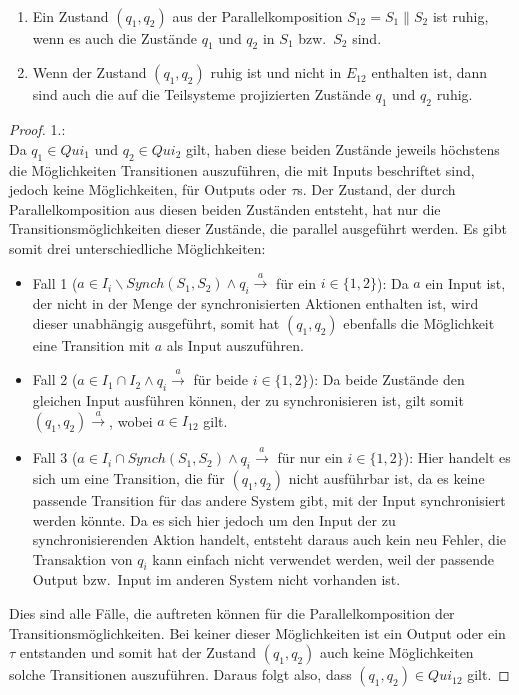 \begin{lem}
  \label{lemRuheParallelkomp}
  ~
  \begin{enumerate}
    \item Ein Zustand $(q_1,q_2)$ aus der Parallelkomposition $S_{12}=S_1\|S_2$
      ist ruhig, wenn es auch die Zustände $q_1$ und $q_2$ in $S_1$ bzw.\ $S_2$
      sind.
    \item Wenn der Zustand $(q_1,q_2)$ ruhig ist und nicht in $E_{12}$
      enthalten ist, dann sind auch die auf die Teilsysteme projizierten
      Zustände $q_1$ und $q_2$ ruhig.
  \end{enumerate}
\end{lem}

\begin{proof}
  1.:\\
  Da $q_1\in Qui_1$ und $q_2\in Qui_2$ gilt, haben
  diese beiden Zustände jeweils höchstens die Möglichkeiten Transitionen
  auszuführen, die mit Inputs beschriftet sind, jedoch keine Möglichkeiten, für
  Outputs oder $\tau$s. Der Zustand, der durch Parallelkomposition aus diesen
  beiden Zuständen entsteht, hat nur die Transitionsmöglichkeiten dieser
  Zustände, die parallel ausgeführt werden. Es gibt somit drei unterschiedliche
  Möglichkeiten:
  \begin{itemize}
    \item Fall 1 ($a\in I_i\backslash Synch(S_1,S_2)\wedge q_i
      \overset{a}{\rightarrow}$ für ein $i\in \{1,2\}$): Da $a$ ein
      Input ist, der nicht in der Menge der synchronisierten Aktionen enthalten
      ist, wird dieser unabhängig ausgeführt, somit hat
      $(q_1,q_2)$ ebenfalls die Möglichkeit eine Transition mit $a$ als Input
      auszuführen.
    \item Fall 2 ($a\in I_1\cap I_2\wedge q_i \overset{a}{\rightarrow}$ für
      beide $i\in \{1,2\}$): Da beide Zustände den gleichen Input ausführen
      können, der zu synchronisieren ist, gilt somit $(q_1,q_2)
      \overset{a}{\rightarrow}$, wobei $a\in I_{12}$ gilt.
    \item Fall 3 ($a\in I_i\cap Synch(S_1,S_2)\wedge q_i
      \overset{a}{\rightarrow}$ für nur ein $i\in \{1,2\}$): Hier handelt es sich
      um eine Transition, die für $(q_1,q_2)$ nicht ausführbar ist, da es keine
      passende Transition für das andere System gibt, mit der Input
      synchronisiert werden könnte. Da es sich hier jedoch um den Input der zu
      synchronisierenden Aktion handelt, entsteht daraus auch kein
      neu Fehler, die Transaktion von $q_i$ kann einfach nicht verwendet
      werden, weil der passende Output bzw.\ Input im anderen System nicht
      vorhanden ist.
  \end{itemize}
  Dies sind alle Fälle, die auftreten können für die Parallelkomposition der
  Transitionsmöglichkeiten. Bei keiner dieser Möglichkeiten ist ein Output oder
  ein $\tau$ entstanden und somit hat der Zustand $(q_1,q_2)$ auch keine
  Möglichkeiten solche Transitionen auszuführen. Daraus folgt also, dass
  $(q_1,q_2)\in Qui_{12}$ gilt.


\end{proof}
